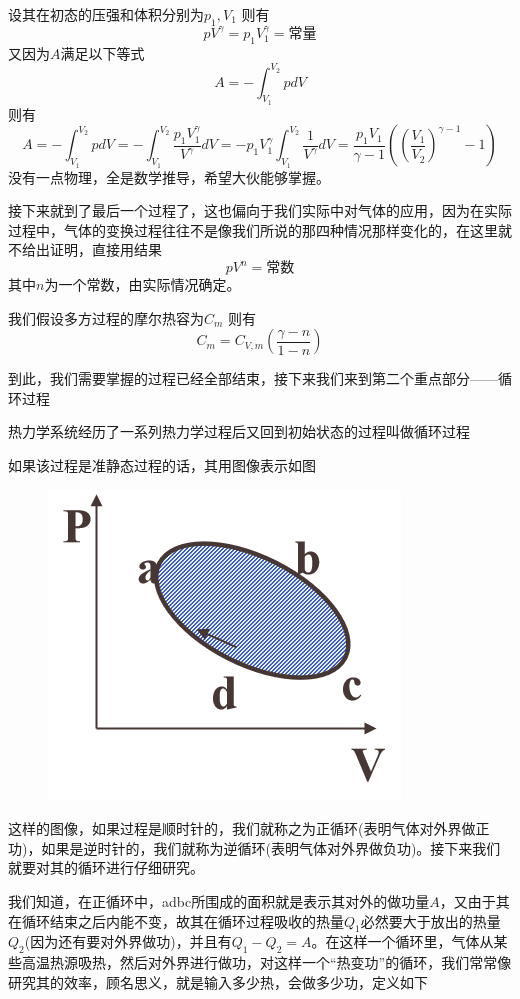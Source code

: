 \documentclass[lang=cn,10pt]{elegantbook}
\begin{document}
	设其在初态的压强和体积分别为$p_{1},V_{1}$
	则有
	\begin{equation*}
		pV^{\gamma}=p_{1}V_{1}^{\gamma}=\text{常量}
	\end{equation*}
	又因为$A$满足以下等式
	\begin{equation*}
		A=-\int_{V_1}^{V_2}{pdV}
	\end{equation*}
	则有
	\begin{equation*}
		A=-\int_{V_1}^{V_2}{pdV}=-\int_{V_1}^{V_2}{}\frac{p_1V_{1}^{\gamma}}{V^{\gamma}}dV=-p_1V_{1}^{\gamma}\int_{V_1}^{V_2}{\frac{1}{V^{\gamma}}dV}=\frac{p_{1}V_{1}}{\gamma-1}((\frac{V_{1}}{V_{2}})^{\gamma-1}-1)
	\end{equation*}
	没有一点物理，全是数学推导，希望大伙能够掌握。
	
	接下来就到了最后一个过程了，这也偏向于我们实际中对气体的应用，因为在实际过程中，气体的变换过程往往不是像我们所说的那四种情况那样变化的，在这里就不给出证明，直接用结果
	\begin{equation*}
		pV^{n}=\text{常数}
	\end{equation*}
	其中$n$为一个常数，由实际情况确定。
	
	我们假设多方过程的摩尔热容为$C_{m}$
	则有
	\begin{equation*}
		C_{m}=C_{V,m}(\frac{\gamma-n}{1-n})
	\end{equation*}
	
	到此，我们需要掌握的过程已经全部结束，接下来我们来到第二个重点部分——循环过程
	
	\begin{definition}[循环过程]
		热力学系统经历了一系列热力学过程后又回到初始状态的过程叫做循环过程
	\end{definition}
	如果该过程是准静态过程的话，其用图像表示如图
	\begin{figure}[h]
		\centering
		\includegraphics[width=0.2\linewidth]{screenshot004}
		\caption{}
		\label{fig:screenshot004}
	\end{figure}
	这样的图像，如果过程是顺时针的，我们就称之为正循环(表明气体对外界做正功)，如果是逆时针的，我们就称为逆循环(表明气体对外界做负功)。接下来我们就要对其的循环进行仔细研究。
	
	我们知道，在正循环中，adbc所围成的面积就是表示其对外的做功量$A$，又由于其在循环结束之后内能不变，故其在循环过程吸收的热量$Q_{1}$必然要大于放出的热量$Q_{2}$(因为还有要对外界做功)，并且有$Q_{1}-Q_{2}=A$。在这样一个循环里，气体从某些高温热源吸热，然后对外界进行做功，对这样一个“热变功”的循环，我们常常像研究其的效率，顾名思义，就是输入多少热，会做多少功，定义如下
	
\end{document}
